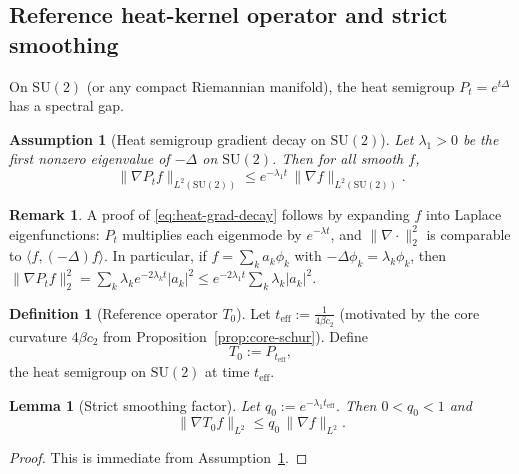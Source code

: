 \documentclass[11pt]{article}
\newtheorem{lemma}[theorem]{Lemma}
\newtheorem{assumption}[theorem]{Assumption}
\theoremstyle{definition}
\newtheorem{definition}[theorem]{Definition}
\newtheorem{remark}[theorem]{Remark}
\newcommand{\1}{\mathbf{1}}
\begin{document}
\subsection{Reference heat-kernel operator and strict smoothing}

On $\mathrm{SU}(2)$ (or any compact Riemannian manifold), the heat semigroup $P_t=e^{t\Delta}$ has a spectral gap.

\begin{assumption}[Heat semigroup gradient decay on $\mathrm{SU}(2)$]\label{ass:heatgap}
Let $\lambda_1>0$ be the first nonzero eigenvalue of $-\Delta$ on $\mathrm{SU}(2)$. Then for all smooth $f$,
\begin{equation}\label{eq:heat-grad-decay}
\|\nabla P_t f\|_{L^2(\mathrm{SU}(2))}\le e^{-\lambda_1 t}\,\|\nabla f\|_{L^2(\mathrm{SU}(2))}.
\end{equation}
\end{assumption}

\begin{remark}
A proof of \eqref{eq:heat-grad-decay} follows by expanding $f$ into Laplace eigenfunctions: $P_t$ multiplies each eigenmode by $e^{-\lambda t}$, and $\|\nabla\cdot\|_2^2$ is comparable to $\langle f,(-\Delta)f\rangle$. In particular, if $f=\sum_k a_k \phi_k$ with $-\Delta\phi_k=\lambda_k\phi_k$, then
\(\|\nabla P_t f\|_2^2=\sum_k \lambda_k e^{-2\lambda_k t}|a_k|^2\le e^{-2\lambda_1 t}\sum_k \lambda_k|a_k|^2\).
\end{remark}

\begin{definition}[Reference operator $T_0$]
Let $t_{\mathrm{eff}}:=\frac{1}{4\beta c_2}$ (motivated by the core curvature $4\beta c_2$ from Proposition~\ref{prop:core-schur}). Define
\[
T_0:=P_{t_{\mathrm{eff}}},
\]
the heat semigroup on $\mathrm{SU}(2)$ at time $t_{\mathrm{eff}}$.
\end{definition}

\begin{lemma}[Strict smoothing factor]\label{lem:q0}
Let $q_0:=e^{-\lambda_1 t_{\mathrm{eff}}}$. Then $0<q_0<1$ and
\begin{equation}\label{eq:q0}
\|\nabla T_0 f\|_{L^2}\le q_0\,\|\nabla f\|_{L^2}.
\end{equation}
\end{lemma}

\begin{proof}
This is immediate from Assumption~\ref{ass:heatgap}.
\end{proof}
\end{document}
